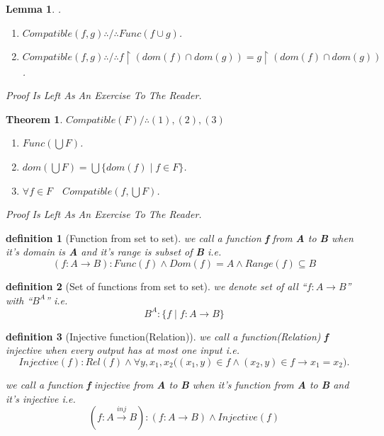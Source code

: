 \documentclass[10pt,a4paper]{book}
\newtheorem{definition}{definition}[section]
\newtheorem{theorem}{Theorem}[section]
\newtheorem{lemma}{Lemma}[section]
\begin{document}
\begin{lemma} .\\
    \begin{enumerate}
        \setlength{\itemsep}{0pt} %
        \item  $Compatible(f,g) \therefore / \therefore Func(f \cup g) $.
        \item  $Compatible(f,g) \therefore / \therefore f \upharpoonright (dom(f) \cap dom(g)) = g \upharpoonright (dom(f) \cap dom(g)) $.
    \end{enumerate}
    Proof Is Left As An Exercise To The Reader.
\end{lemma}

\begin{theorem} $Compatible(F) / \therefore (1),(2),(3)  $
    \begin{enumerate}
        \setlength{\itemsep}{0pt} %
        \item  $Func(\bigcup F) $.
        \item  $ dom(\bigcup F) = \bigcup \{ dom(f) \mid f \in F \} $.
        \item  $ \forall f \in F \quad Compatible(f,\bigcup F) $.
    \end{enumerate}
    Proof Is Left As An Exercise To The Reader.
\end{theorem}

\begin{definition} [Function from set to set]
      we call a function \textbf{f} from \textbf{A} to \textbf{B}
    when it's domain is  \textbf{A} and it's range is subset of \textbf{B} i.e.
    \[ (f:A \rightarrow B) : Func(f) \land Dom(f)=A \land Range(f) \subseteq B \]
\end{definition}

\begin{definition} [Set of functions from set to set]
     we denote set of all ``$f:A \rightarrow B$'' with ``$B^A$''  i.e.
    \[ B^A : \{ f \mid f :A \rightarrow B \} \]
\end{definition}

\begin{definition} [Injective function(Relation)]
    we call a function(Relation) \textbf{f} injective when every output has at most one input i.e.
    \[ Injective(f) : Rel(f) \land  \forall y ,x_1 , x_2 \Big((x_1,y) \in f \wedge (x_2,y) \in f \rightarrow x_1 = x_2 \Big). \]

    we call a function \textbf{f} injective from \textbf{A} to \textbf{B} when it's
    function from \textbf{A} to \textbf{B} and it's injective i.e.
    \[ (f:A \xrightarrow{inj} B) :  (f:A \rightarrow B) \land Injective(f) \]
\end{definition}
\end{document}
